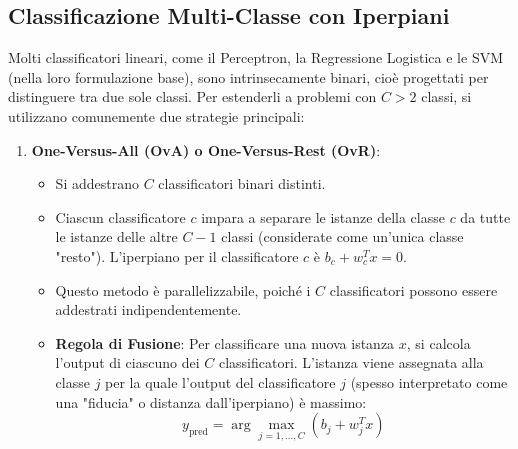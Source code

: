 \documentclass{article}
\begin{document}
\subsection{Classificazione Multi-Classe con Iperpiani}
Molti classificatori lineari, come il Perceptron, la Regressione Logistica e le SVM (nella loro formulazione base), sono intrinsecamente binari, cioè progettati per distinguere tra due sole classi. Per estenderli a problemi con $C > 2$ classi, si utilizzano comunemente due strategie principali:

\begin{enumerate}
    \item \textbf{One-Versus-All (OvA) o One-Versus-Rest (OvR)}:
          \begin{itemize}
              \item Si addestrano $C$ classificatori binari distinti.
              \item Ciascun classificatore $c$ impara a separare le istanze della classe $c$ da tutte le istanze delle altre $C-1$ classi (considerate come un'unica classe "resto"). L'iperpiano per il classificatore $c$ è $b_c + w_c^T x = 0$.
              \item Questo metodo è parallelizzabile, poiché i $C$ classificatori possono essere addestrati indipendentemente.
              \item \textbf{Regola di Fusione}: Per classificare una nuova istanza $x$, si calcola l'output di ciascuno dei $C$ classificatori. L'istanza viene assegnata alla classe $j$ per la quale l'output del classificatore $j$ (spesso interpretato come una "fiducia" o distanza dall'iperpiano) è massimo:
                    $$ y_{\text{pred}} = \arg\max_{j=1,\dots,C} (b_j + w_j^T x) $$
          \end{itemize}


\end{enumerate}
\end{document}
